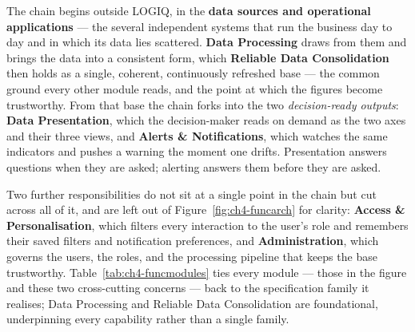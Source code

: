 
The chain begins outside LOGIQ, in the \textbf{data sources and operational applications} --- the
several independent systems that run the business day to day and in which its data lies scattered.
\textbf{Data Processing} draws from them and brings the data into a consistent form, which
\textbf{Reliable Data Consolidation} then holds as a single, coherent, continuously refreshed base ---
the common ground every other module reads, and the point at which the figures become trustworthy.
From that base the chain forks into the two \emph{decision-ready outputs}: \textbf{Data Presentation},
which the decision-maker reads on demand as the two axes and their three views, and \textbf{Alerts \&
Notifications}, which watches the same indicators and pushes a warning the moment one drifts.
Presentation answers questions when they are asked; alerting answers them before they are asked.

Two further responsibilities do not sit at a single point in the chain but cut across all of it, and
are left out of Figure~\ref{fig:ch4-funcarch} for clarity: \textbf{Access \& Personalisation}, which
filters every interaction to the user's role and remembers their saved filters and notification
preferences, and \textbf{Administration}, which governs the users, the roles, and the processing
pipeline that keeps the base trustworthy. Table~\ref{tab:ch4-funcmodules} ties every module --- those
in the figure and these two cross-cutting concerns --- back to the specification family it realises;
Data Processing and Reliable Data Consolidation are foundational, underpinning every capability rather
than a single family.

